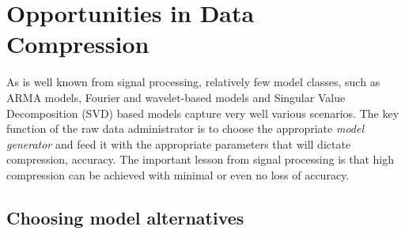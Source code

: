 
\section{Opportunities in Data Compression}
\label{sec:compression}
As is well known from signal processing, relatively few model classes, such as ARMA models, Fourier and wavelet-based models and Singular Value Decomposition (SVD) based models capture very well various scenarios. The key function of the raw data administrator is to choose the appropriate {\em model generator} and feed it with the appropriate parameters that will dictate compression, accuracy. The important lesson from signal processing is that high compression can be achieved with minimal or even no loss of accuracy.


\subsection{Choosing model alternatives}
\label{sec:choosing-model-alternatives}


